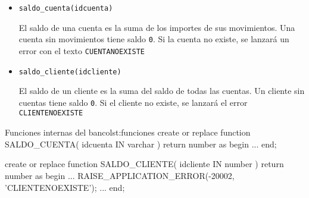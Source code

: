 \begin{homeworkProblem}

  \begin{itemize}
  \item \texttt{saldo\_cuenta(idcuenta)}

    \begin{Indentado}
      El saldo de una cuenta es la suma de los importes de sus movimientos. Una cuenta sin movimientos tiene saldo \texttt{0}. Si la cuenta no existe, se lanzará un error con el texto \texttt{CUENTANOEXISTE} 
    \end{Indentado}
    
  \item \texttt{saldo\_cliente(idcliente)}

    \begin{Indentado}
      El saldo de un cliente es la suma del saldo de todas las cuentas. Un cliente sin cuentas tiene saldo \texttt{0}. Si el cliente no existe, se lanzará el error \texttt{CLIENTENOEXISTE}
    \end{Indentado}


  \end{itemize}

\begin{listadosql}{Funciones internas del banco}{lst:funciones}
create or replace function SALDO_CUENTA( idcuenta IN varchar )
return number as begin
  ...
end; 

create or replace function SALDO_CLIENTE( idcliente IN number )
return number as begin
  ...
  RAISE_APPLICATION_ERROR(-20002, 'CLIENTENOEXISTE');
  ...
end; 

\end{listadosql}


\end{homeworkProblem}


